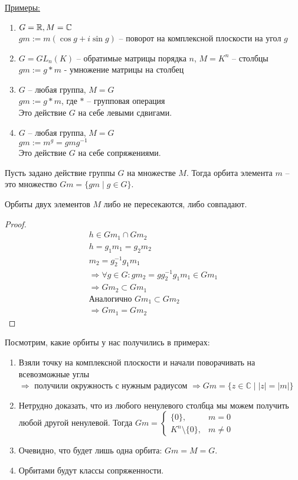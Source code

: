 \underline{Примеры:}
\begin{enumerate}
    \item $G = \mathbb{R}, M = \mathbb{C}$ \\ $gm := m(\cos g + i\sin g)$ -- поворот на комплексной плоскости на угол $g$
    \item $G = GL_n(K)$ -- обратимые матрицы порядка $n$, $M = K^n$ -- столбцы \\ $gm := g * m$ - умножение матрицы на столбец
    \item $G$ -- любая группа, $M = G$ \\ $gm := g * m$, где $*$ -- групповая операция \\ Это действие $G$ на себе левыми сдвигами.
    \item $G$ -- любая группа, $M = G$ \\ $gm := m^g = gmg^{-1}$ \\ Это действие $G$ на себе сопряжениями.
\end{enumerate}

\begin{conj}
    Пусть задано действие группы $G$ на множестве $M$.
    Тогда орбита элемента $m$ -- это множество $Gm = \{gm\; | \; g \in G\}$.
\end{conj}

\begin{theorem}
    Орбиты двух элементов $M$ либо не пересекаются, либо совпадают.
\end{theorem}
\begin{proof}
    \begin{gather*}
        h \in Gm_1 \cap Gm_2 \\
        h = g_1m_1 = g_2m_2 \\
        m_2 = g_2^{-1}g_1m_1  \\
        \Rightarrow \forall g \in G: gm_2 = gg_2^{-1}g_1m_1 \in Gm_1 \\
        \Rightarrow Gm_2 \subset Gm_1 \\
        \text{Аналогично } Gm_1 \subset Gm_2 \\
        \Rightarrow Gm_1 = Gm_2
    \end{gather*}
\end{proof}
Посмотрим, какие орбиты у нас получились в примерах:
\begin{enumerate}
    \item Взяли точку на комплексной плоскости и начали поворачивать на всевозможные углы \\ 
    $\Rightarrow$ получили окружность с нужным радиусом $\Rightarrow Gm = \{ z \in \mathbb{C} \; | \; |z| = |m| \}$
    \item Нетрудно доказать, что из любого ненулевого столбца мы можем получить любой другой ненулевой. 
    Тогда $Gm = \begin{cases}
        \{ 0 \}, & m = 0 \\
        K^n \setminus \{ 0 \}, & m \neq 0
    \end{cases} $
    \item Очевидно, что будет лишь одна орбита: $Gm = M = G$.
    \item Орбитами будут классы сопряженности.
\end{enumerate}

